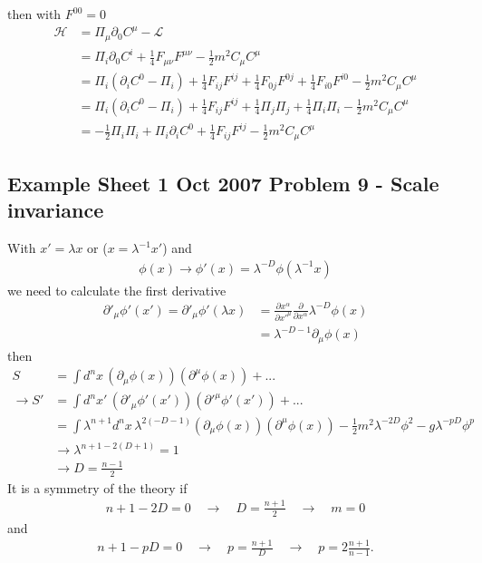 \documentclass[../main.tex]{subfiles}
\begin{document}
then with $F^{00}=0$
\begin{align}
\mathcal{H}
&=\Pi_\mu\partial_0C^\mu-\mathcal{L}\\
&=\Pi_i\partial_0C^i+\frac{1}{4}F_{\mu\nu}F^{\mu\nu}-\frac{1}{2}m^2C_\mu C^\mu\\
&=\Pi_i(\partial_iC^0-\Pi_i)+\frac{1}{4}F_{ij}F^{ij}+\frac{1}{4}F_{0j}F^{0j}+\frac{1}{4}F_{i0}F^{i0}-\frac{1}{2}m^2C_\mu C^\mu\\
&=\Pi_i(\partial_iC^0-\Pi_i)+\frac{1}{4}F_{ij}F^{ij}+\frac{1}{4}\Pi_j\Pi_j+\frac{1}{4}\Pi_i\Pi_i-\frac{1}{2}m^2C_\mu C^\mu\\
&=-\frac{1}{2}\Pi_i\Pi_i+\Pi_i\partial_iC^0+\frac{1}{4}F_{ij}F^{ij}-\frac{1}{2}m^2C_\mu C^\mu
\end{align}

\subsection{Example Sheet 1 Oct 2007 Problem 9 - Scale invariance}
With $x'=\lambda x$ or ($x=\lambda^{-1}x'$) and
\begin{align}
\phi(x)\rightarrow\phi'(x)=\lambda^{-D}\phi(\lambda^{-1}x)
\end{align}
we need to calculate the first derivative
\begin{align}
\partial'_\mu\phi'(x')
=\partial'_\mu\phi'(\lambda x)
&=\frac{\partial x^\alpha}{\partial x'^\mu}\frac{\partial}{\partial x^\alpha}\lambda^{-D}\phi(x)\\
&=\lambda^{-D-1}\partial_\mu\phi(x)
\end{align}
then
\begin{align}
S
&=\int d^nx\,(\partial_\mu\phi(x))(\partial^\mu\phi(x))+...\\
\rightarrow S'
&=\int d^nx'\,(\partial'_\mu\phi'(x'))(\partial'^\mu\phi'(x'))+...\\
&=\int \lambda^{n+1}d^nx\,\lambda^{2(-D-1)}(\partial_\mu\phi(x))(\partial^\mu\phi(x))-\frac{1}{2}m^2\lambda^{-2D}\phi^2-g\lambda^{-pD}\phi^p\\
&\rightarrow \lambda^{n+1-2(D+1)}=1\\
&\rightarrow D=\frac{n-1}{2}
\end{align}
It is a symmetry of the theory if
\begin{align}
n+1-2D=0\quad\rightarrow\quad D=\frac{n+1}{2} \quad\rightarrow\quad m=0
\end{align}
and
\begin{align}
n+1-pD=0\quad\rightarrow\quad p=\frac{n+1}{D}\quad\rightarrow\quad p=2\frac{n+1}{n-1}.
\end{align}
\end{document}
